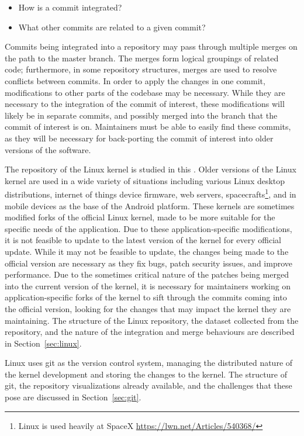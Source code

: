 \begin{textbox}
\begin{itemize}
  \item How is a commit integrated?
  \item What other commits are related to a given commit?
\end{itemize}
\end{textbox}

Commits being integrated into a repository may pass through multiple
merges on the path to the master branch. The merges form logical
groupings of related code; furthermore, in some repository structures,
merges are used to resolve conflicts between commits. In order to apply
the changes in one commit, modifications to other parts of the codebase
may be necessary. While they are necessary to the integration of the
commit of interest, these modifications will likely be in separate
commits, and possibly merged into the branch that the commit of interest
is on. Maintainers must be able to easily find these commits, as they
will be necessary for back-porting the commit of interest into older
versions of the software.

The repository of the Linux kernel is studied in this \paper{}. Older
versions of the Linux kernel are used in a wide variety of situations
including various Linux desktop distributions, internet of things device
firmware, web servers, spacecrafts\footnote{Linux is used heavily at
  SpaceX \url{https://lwn.net/Articles/540368/}}, and in mobile devices
as the base of the Android platform. These kernels are sometimes
modified forks of the official Linux kernel, made to be more suitable
for the specific needs of the application. Due to these
application-specific modifications, it is not feasible to update to the
latest version of the kernel for every official update. While it may not
be feasible to update, the changes being made to the official version
are necessary as they fix bugs, patch security issues, and improve
performance. Due to the sometimes critical nature of the patches being
merged into the current version of the kernel, it is necessary for
maintainers working on application-specific forks of the kernel to sift
through the commits coming into the official version, looking for the
changes that may impact the kernel they are maintaining. The structure
of the Linux repository, the dataset collected from the repository, and
the nature of the integration and merge behaviours are described in
Section~\ref{sec:linux}.

Linux uses git as the version control system, managing the distributed
nature of the kernel development and storing the changes to the kernel.
The structure of git, the repository visualizations already available,
and the challenges that these pose are discussed in
Section~\ref{sec:git}.

